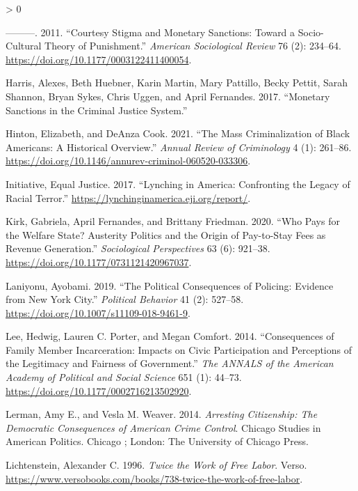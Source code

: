 \documentclass[
  12pt,
]{article}
\newlength{\cslhangindent}
\newenvironment{CSLReferences}[2] %
 {%
  \setlength{\parindent}{0pt}
  \ifodd #1 \everypar{\setlength{\hangindent}{\cslhangindent}}\ignorespaces\fi
  \ifnum #2 > 0
  \setlength{\parskip}{#2\baselineskip}
  \fi
 }%
 {}
\begin{document}
\begin{CSLReferences}{1}{0}
\leavevmode\hypertarget{ref-Harris2011}{}%
---------. 2011. {``Courtesy {Stigma} and {Monetary Sanctions}: {Toward} a {Socio}-{Cultural Theory} of {Punishment}.''} \emph{American Sociological Review} 76 (2): 234--64. \url{https://doi.org/10.1177/0003122411400054}.

\leavevmode\hypertarget{ref-Harris2017}{}%
Harris, Alexes, Beth Huebner, Karin Martin, Mary Pattillo, Becky Pettit, Sarah Shannon, Bryan Sykes, Chris Uggen, and April Fernandes. 2017. {``Monetary {Sanctions} in the {Criminal Justice System}.''}

\leavevmode\hypertarget{ref-Hinton2021}{}%
Hinton, Elizabeth, and DeAnza Cook. 2021. {``The {Mass Criminalization} of {Black Americans}: {A Historical Overview}.''} \emph{Annual Review of Criminology} 4 (1): 261--86. \url{https://doi.org/10.1146/annurev-criminol-060520-033306}.

\leavevmode\hypertarget{ref-EqualJusticeInitiative2017}{}%
Initiative, Equal Justice. 2017. {``Lynching in {America}: {Confronting} the {Legacy} of {Racial Terror}.''} \url{https://lynchinginamerica.eji.org/report/}.

\leavevmode\hypertarget{ref-Kirk2020}{}%
Kirk, Gabriela, April Fernandes, and Brittany Friedman. 2020. {``Who {Pays} for the {Welfare State}? {Austerity Politics} and the {Origin} of {Pay}-to-{Stay Fees} as {Revenue Generation}.''} \emph{Sociological Perspectives} 63 (6): 921--38. \url{https://doi.org/10.1177/0731121420967037}.

\leavevmode\hypertarget{ref-Laniyonu2019}{}%
Laniyonu, Ayobami. 2019. {``The {Political Consequences} of {Policing}: {Evidence} from {New York City}.''} \emph{Political Behavior} 41 (2): 527--58. \url{https://doi.org/10.1007/s11109-018-9461-9}.

\leavevmode\hypertarget{ref-Lee2014}{}%
Lee, Hedwig, Lauren C. Porter, and Megan Comfort. 2014. {``Consequences of {Family Member Incarceration}: {Impacts} on {Civic Participation} and {Perceptions} of the {Legitimacy} and {Fairness} of {Government}.''} \emph{The ANNALS of the American Academy of Political and Social Science} 651 (1): 44--73. \url{https://doi.org/10.1177/0002716213502920}.

\leavevmode\hypertarget{ref-Lerman2014}{}%
Lerman, Amy E., and Vesla M. Weaver. 2014. \emph{Arresting Citizenship: The Democratic Consequences of {American} Crime Control}. Chicago Studies in {American} Politics. {Chicago ; London}: {The University of Chicago Press}.

\leavevmode\hypertarget{ref-Lichtenstein1996}{}%
Lichtenstein, Alexander C. 1996. \emph{Twice the {Work} of {Free Labor}}. {Verso}. \url{https://www.versobooks.com/books/738-twice-the-work-of-free-labor}.


\end{CSLReferences}
\end{document}
